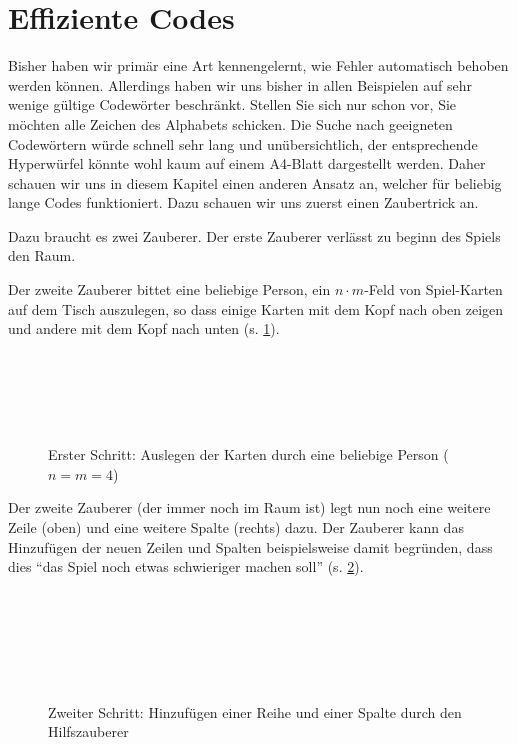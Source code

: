 \section{Effiziente Codes}

Bisher haben wir primär eine Art kennengelernt, wie Fehler automatisch behoben werden können. Allerdings haben wir uns bisher in allen Beispielen auf sehr wenige gültige Codewörter beschränkt. Stellen Sie sich nur schon vor, Sie möchten alle Zeichen des Alphabets schicken. Die Suche nach geeigneten Codewörtern würde schnell sehr lang und unübersichtlich, der entsprechende Hyperwürfel könnte wohl kaum auf einem A4-Blatt dargestellt werden. Daher schauen wir uns in diesem Kapitel einen anderen Ansatz an, welcher für beliebig lange Codes funktioniert. Dazu schauen wir uns zuerst einen Zaubertrick an.

Dazu braucht es zwei Zauberer. Der erste Zauberer verlässt zu beginn des Spiels den Raum.

Der zweite Zauberer bittet eine beliebige Person, ein $n\cdot m$-Feld von Spiel-Karten auf dem Tisch auszulegen, so dass einige Karten mit dem Kopf nach oben zeigen und andere mit dem Kopf nach unten (s. \cref{fig:zauberer-1}).

\begin{figure}[H]
    \centering
    \\
    \\
    \\
    \\
    \caption{Erster Schritt: Auslegen der Karten durch eine beliebige Person ($n=m=4$)}
    \label{fig:zauberer-1}
\end{figure}


Der zweite Zauberer (der immer noch im Raum ist) legt nun noch eine weitere Zeile (oben) und eine weitere Spalte (rechts) dazu. Der Zauberer kann das Hinzufügen der neuen Zeilen und Spalten beispielsweise damit begründen, dass dies ``das Spiel noch etwas schwieriger machen soll'' (s. \cref{fig:zauberer-2}).

\begin{figure}[H]
    \centering
    \\
    \\
    \\
    \\
    \\
    \caption{Zweiter Schritt: Hinzufügen einer Reihe und einer Spalte durch den Hilfszauberer}
    \label{fig:zauberer-2}
\end{figure}

